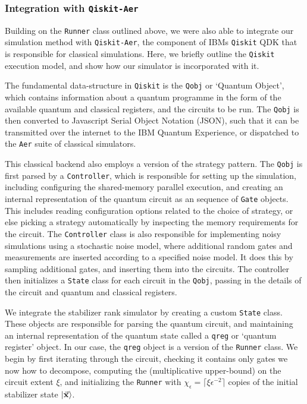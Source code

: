 \subsubsection*{Integration with \texttt{Qiskit-Aer}}
Building on the \texttt{Runner} class outlined above, we were also able to integrate our simulation method with \texttt{Qiskit-Aer}, the component of IBMs \texttt{Qiskit} QDK that is responsible for classical simulations. Here, we briefly outline the \texttt{Qiskit} execution model, and show how our simulator is incorporated with it.\par
The fundamental data-structure in \texttt{Qiskit} is the \texttt{Qobj} or `Quantum Object', which contains information about a quantum programme in the form of the available quantum and classical registers, and the circuits to be run. The \texttt{Qobj} is then converted to Javascript Serial Object Notation (JSON), such that it can be transmitted over the internet to the IBM Quantum Experience, or dispatched to the \texttt{Aer} suite of classical simulators.\par 
This classical backend also employs a version of the strategy pattern. The \texttt{Qobj} is first parsed by a \texttt{Controller}, which is responsible for setting up the simulation, including configuring the shared-memory parallel execution, and creating an internal representation of the quantum circuit as an sequence of \texttt{Gate} objects. This includes reading configuration options related to the choice of strategy, or else picking a strategy automatically by inspecting the memory requirements for the circuit. The \texttt{Controller} class is also responsible for implementing noisy simulations using a stochastic noise model, where additional random gates and measurements are inserted according to a specified noise model. It does this by sampling additional gates, and inserting them into the circuits. The controller then initializes a \texttt{State} class for each circuit in the \texttt{Qobj}, passing in the details of the circuit and quantum and classical registers. \par
We integrate the stabilizer rank simulator by creating a custom \texttt{State} class. These objects are responsible for parsing the quantum circuit, and maintaining an internal representation of the quantum state called a \texttt{qreg} or `quantum register' object. In our case, the \texttt{qreg} object is a version of the \texttt{Runner} class. We begin by first iterating through the circuit, checking it contains only gates we now how to decompose, computing the (multiplicative upper-bound) on the circuit extent $\xi$, and initializing the \texttt{Runner} with $\chi_{\epsilon}=\lceil \xi \epsilon^{-2}\rceil$ copies of the initial stabilizer state $\ket{\va{x}}$.\par
